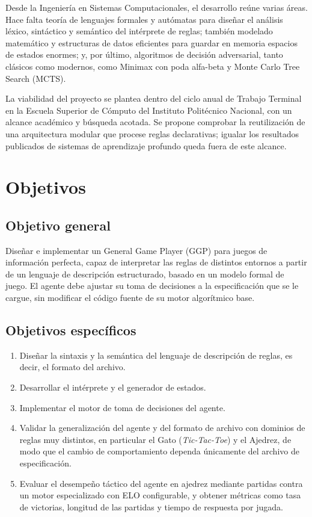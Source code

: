 Desde la Ingeniería en Sistemas Computacionales, el desarrollo reúne varias áreas. Hace falta teoría de lenguajes formales y autómatas para diseñar el análisis léxico, sintáctico y semántico del intérprete de reglas; también modelado matemático y estructuras de datos eficientes para guardar en memoria espacios de estados enormes; y, por último, algoritmos de decisión adversarial, tanto clásicos como modernos, como Minimax con poda alfa-beta y Monte Carlo Tree Search (MCTS).

La viabilidad del proyecto se plantea dentro del ciclo anual de Trabajo Terminal en la Escuela Superior de Cómputo del Instituto Politécnico Nacional, con un alcance académico y búsqueda acotada. Se propone comprobar la reutilización de una arquitectura modular que procese reglas declarativas; igualar los resultados publicados de sistemas de aprendizaje profundo queda fuera de este alcance.

\section{Objetivos}

\subsection{Objetivo general}

Diseñar e implementar un General Game Player (GGP) para juegos de información perfecta, capaz de interpretar las reglas de distintos entornos a partir de un lenguaje de descripción estructurado, basado en un modelo formal de juego. El agente debe ajustar su toma de decisiones a la especificación que se le cargue, sin modificar el código fuente de su motor algorítmico base.

\subsection{Objetivos específicos}

\begin{enumerate}
    \item Diseñar la sintaxis y la semántica del lenguaje de descripción de reglas, es decir, el formato del archivo.
    \item Desarrollar el intérprete y el generador de estados.
    \item Implementar el motor de toma de decisiones del agente.
    \item Validar la generalización del agente y del formato de archivo con dominios de reglas muy distintos, en particular el Gato (\textit{Tic-Tac-Toe}) y el Ajedrez, de modo que el cambio de comportamiento dependa únicamente del archivo de especificación.
    \item Evaluar el desempeño táctico del agente en ajedrez mediante partidas contra un motor especializado con ELO configurable, y obtener métricas como tasa de victorias, longitud de las partidas y tiempo de respuesta por jugada.
\end{enumerate}

